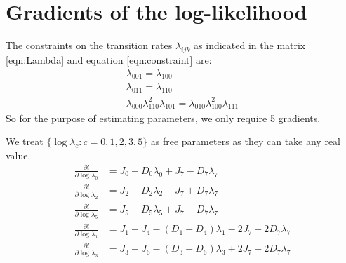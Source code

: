 \documentclass[11pt]{article}
\begin{document}
\section{Gradients of the log-likelihood}

The constraints on the transition rates $\lambda_{ijk}$ as indicated
in the matrix \eqref{eqn:Lambda} and equation \eqref{eqn:constraint}
are:
\begin{equation}\label{eqn:constraints}
  \begin{array}{c}
    \lambda_{001} = \lambda_{100}\\
    \lambda_{011} = \lambda_{110}\\
    \lambda_{000}\lambda_{110}^2\lambda_{101} = \lambda_{010}\lambda_{100}^2\lambda_{111}
  \end{array}
\end{equation}
So for the purpose of estimating parameters, we only require 5
gradients.

We treat $\{\log\lambda_c: c = 0,1,2,3,5\}$ as free parameters as they
can take any real value.
\begin{equation}
  \begin{aligned}
    \frac{\partial l}{\partial \log\lambda_0} &= J_0 - D_0\lambda_0 + J_7 - D_7\lambda_7\\
    \frac{\partial l}{\partial \log\lambda_2} &= J_2 - D_2\lambda_2 - J_7 + D_7\lambda_7 \\
    \frac{\partial l}{\partial \log\lambda_5} &= J_5 - D_5\lambda_5 + J_7 - D_7\lambda_7\\
    \frac{\partial l}{\partial \log\lambda_1} &= J_1 + J_4 - (D_1 + D_4)\lambda_1 - 2J_7 + 2D_7\lambda_7\\
    \frac{\partial l}{\partial \log\lambda_3} &= J_3 + J_6 - (D_3 + D_6)\lambda_3 + 2J_7 - 2D_7\lambda_7
  \end{aligned}
\end{equation}

\appendix
\end{document}
